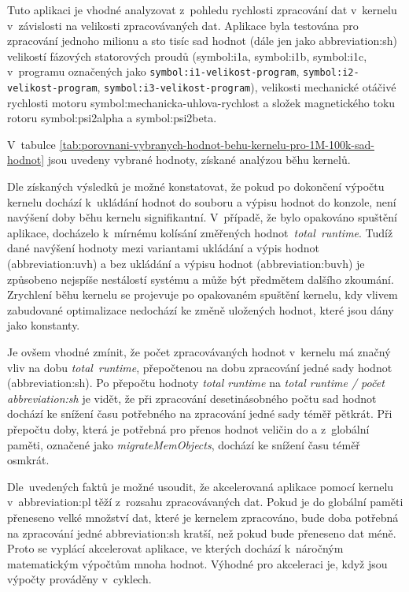 \documentclass[a4paper, twoside, 11pt]{article}
\begin{document}
		Tuto aplikaci je vhodné analyzovat z~pohledu rychlosti zpracování dat v~kernelu v~závislosti na velikosti zpracovávaných dat. Aplikace byla testována pro zpracování jednoho milionu a sto tisíc sad hodnot (dále jen jako \gls{abbreviation:sh}) velikostí fázových statorových proudů (\gls{symbol:i1a}, \gls{symbol:i1b}, \gls{symbol:i1c}, v~programu označených jako \texttt{\gls{symbol:i1-velikost-program}}, \texttt{\gls{symbol:i2-velikost-program}}, \texttt{\gls{symbol:i3-velikost-program}}), velikosti mechanické otáčivé rychlosti motoru \gls{symbol:mechanicka-uhlova-rychlost} a složek magnetického toku rotoru \gls{symbol:psi2alpha} a \gls{symbol:psi2beta}.\par
		V~tabulce \ref{tab:porovnani-vybranych-hodnot-behu-kernelu-pro-1M-100k-sad-hodnot} jsou uvedeny vybrané hodnoty, získané analýzou běhu kernelů.\par
		Dle získaných výsledků je možné konstatovat, že pokud po dokončení výpočtu kernelu dochází k~ukládání hodnot do souboru a výpisu hodnot do konzole, není navýšení doby běhu kernelu signifikantní. V~případě, že bylo opakováno spuštění aplikace, docházelo k~mírnému kolísání změřených hodnot~\textit{total~runtime}. Tudíž dané navýšení hodnoty mezi variantami ukládání a výpis hodnot (\gls{abbreviation:uvh}) a bez ukládání a výpisu hodnot (\gls{abbreviation:buvh}) je způsobeno nejspíše nestálostí systému a může být předmětem dalšího zkoumání. Zrychlení běhu kernelu se projevuje po opakovaném spuštění kernelu, kdy vlivem zabudované optimalizace nedochází ke změně uložených hodnot, které jsou dány jako konstanty.\par
		Je ovšem vhodné zmínit, že počet zpracovávaných hodnot v~kernelu má značný vliv na dobu \textit{total~runtime}, přepočtenou na dobu zpracování jedné sady hodnot (\gls{abbreviation:sh}). Po přepočtu hodnoty \textit{total runtime} na \textit{total runtime / počet \gls{abbreviation:sh}} je vidět, že při zpracování desetinásobného počtu sad hodnot dochází ke snížení času potřebného na zpracování jedné sady téměř pětkrát. Při přepočtu doby, která je potřebná pro přenos hodnot veličin do a z~globální paměti, označené jako \textit{migrateMemObjects}, dochází ke snížení času téměř osmkrát.\par
		Dle~uvedených faktů je možné usoudit, že akcelerovaná aplikace pomocí kernelu v~\gls{abbreviation:pl} těží z~rozsahu zpracovávaných dat. Pokud je do globální paměti přeneseno velké množství dat, které je kernelem zpracováno, bude doba potřebná na zpracování jedné \gls{abbreviation:sh} kratší, než pokud bude přeneseno dat méně. Proto se vyplácí akcelerovat aplikace, ve kterých dochází k~náročným matematickým výpočtům mnoha hodnot. Výhodné pro akceleraci je, když jsou výpočty prováděny v~cyklech.\par
\end{document}
